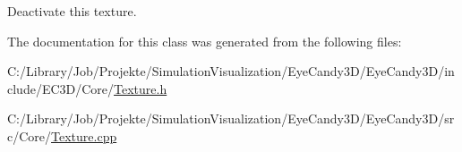 Deactivate this texture. 

The documentation for this class was generated from the following files\+:\begin{DoxyCompactItemize}
\item 
C\+:/\+Library/\+Job/\+Projekte/\+Simulation\+Visualization/\+Eye\+Candy3\+D/\+Eye\+Candy3\+D/include/\+E\+C3\+D/\+Core/\mbox{\hyperlink{_texture_8h}{Texture.\+h}}\item 
C\+:/\+Library/\+Job/\+Projekte/\+Simulation\+Visualization/\+Eye\+Candy3\+D/\+Eye\+Candy3\+D/src/\+Core/\mbox{\hyperlink{_texture_8cpp}{Texture.\+cpp}}\end{DoxyCompactItemize}
